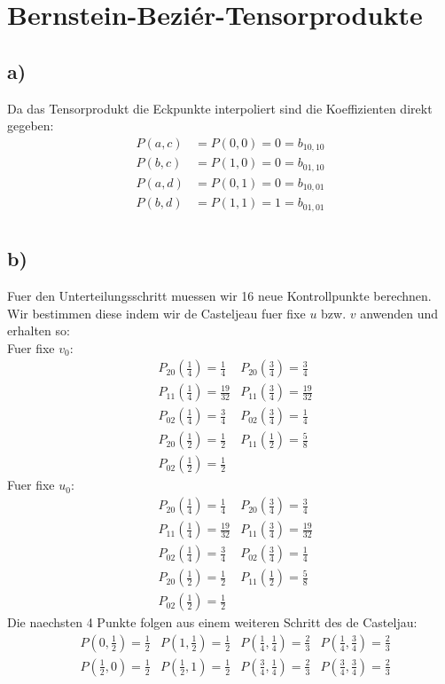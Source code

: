 
\section*{Bernstein-Bezi\'er-Tensorprodukte}
\subsection*{a)} 


Da das Tensorprodukt die Eckpunkte interpoliert sind die Koeffizienten direkt gegeben:
\begin{align}
	P(a,c) &= P(0,0) = 0 = b_{10,10} \\
	P(b,c) &= P(1,0) = 0 = b_{01,10} \\
	P(a,d) &= P(0,1) = 0 = b_{10,01} \\
	P(b,d) &= P(1,1) = 1 = b_{01,01} \\
\end{align}


\subsection*{b)}
Fuer den Unterteilungsschritt muessen wir 16 neue Kontrollpunkte berechnen. Wir bestimmen diese indem wir de Casteljeau fuer fixe $u$ bzw. $v$ anwenden und erhalten so:\\
Fuer fixe $v_0$:
\begin{align}
	&P_{20}(\frac{1}{4}) = \frac{1}{4} 
	&P_{20}(\frac{3}{4}) = \frac{3}{4} \\
	&P_{11}(\frac{1}{4}) = \frac{19}{32} 
	&P_{11}(\frac{3}{4}) = \frac{19}{32} \\
	&P_{02}(\frac{1}{4}) = \frac{3}{4} 	
	&P_{02}(\frac{3}{4}) = \frac{1}{4} \\
	&P_{20}(\frac{1}{2}) = \frac{1}{2}
	&P_{11}(\frac{1}{2}) = \frac{5}{8} \\
	&P_{02}(\frac{1}{2}) = \frac{1}{2}
\end{align}
Fuer fixe $u_0$:
\begin{align}
	&P_{20}(\frac{1}{4}) = \frac{1}{4} 
	&P_{20}(\frac{3}{4}) = \frac{3}{4} \\
	&P_{11}(\frac{1}{4}) = \frac{19}{32} 
	&P_{11}(\frac{3}{4}) = \frac{19}{32} \\
	&P_{02}(\frac{1}{4}) = \frac{3}{4} 	
	&P_{02}(\frac{3}{4}) = \frac{1}{4}\\
	&P_{20}(\frac{1}{2}) = \frac{1}{2}
	&P_{11}(\frac{1}{2}) = \frac{5}{8} \\
	&P_{02}(\frac{1}{2}) = \frac{1}{2} 
\end{align}
Die naechsten 4 Punkte folgen aus einem weiteren Schritt des de Casteljau:
\begin{align}
    &P(0,\frac{1}{2}) = \frac{1}{2}
    &P(1,\frac{1}{2}) = \frac{1}{2}
	&P(\frac{1}{4},\frac{1}{4}) = \frac{2}{3}
	&P(\frac{1}{4},\frac{3}{4}) = \frac{2}{3} \\
	&P(\frac{1}{2},0) = \frac{1}{2}
	&P(\frac{1}{2},1) = \frac{1}{2}
	&P(\frac{3}{4},\frac{1}{4}) = \frac{2}{3} 
	&P(\frac{3}{4},\frac{3}{4}) = \frac{2}{3} 
\end{align}


